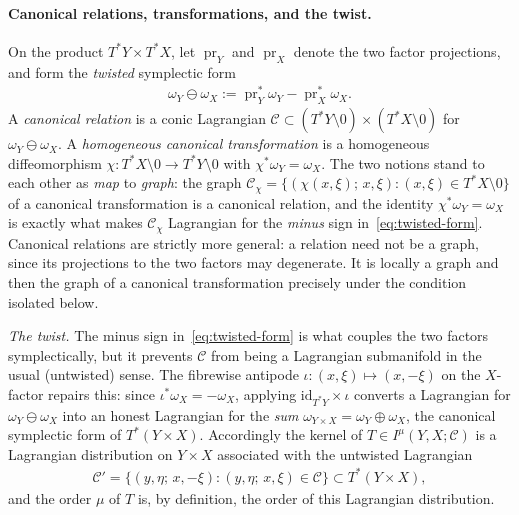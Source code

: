 \documentclass[12pt]{article}
\numberwithin{equation}{section}
\numberwithin{figure}{section}
\numberwithin{equation}{section}
\begin{document}
\paragraph{Canonical relations, transformations, and the twist.}
On the product $T^*Y\times T^*X$, let $\operatorname{pr}_Y$ and $\operatorname{pr}_X$
denote the two factor projections, and form the \emph{twisted} symplectic form
\begin{align}
    \omega_Y\ominus\omega_X
    :=\operatorname{pr}_Y^*\omega_Y-\operatorname{pr}_X^*\omega_X .
    \label{eq:twisted-form}
\end{align}
A \emph{canonical relation} is a conic Lagrangian
$\mathcal{C}\subset(T^*Y\setminus0)\times(T^*X\setminus0)$ for $\omega_Y\ominus\omega_X$.  A
\emph{homogeneous canonical transformation} is a homogeneous diffeomorphism
$\chi:T^*X\setminus0\to T^*Y\setminus0$ with $\chi^*\omega_Y=\omega_X$.  The two
notions stand to each other as \emph{map} to \emph{graph}: the graph
$\mathcal{C}_\chi=\{(\chi(x,\xi);\,x,\xi):(x,\xi)\in T^*X\setminus0\}$ of a canonical
transformation is a canonical relation, and the identity $\chi^*\omega_Y=\omega_X$
is exactly what makes $\mathcal{C}_\chi$ Lagrangian for the \emph{minus} sign
in~\eqref{eq:twisted-form}.  Canonical relations are strictly more general: 
a relation need not be a graph, since its projections to the two factors
may degenerate. It is locally a graph and then the graph of a canonical
transformation precisely under the condition isolated below.

\emph{The twist.}  The minus sign in~\eqref{eq:twisted-form} is what couples the
two factors symplectically, but it prevents $\mathcal{C}$ from being a Lagrangian submanifold
in the usual (untwisted) sense.  The fibrewise antipode
$\iota:(x,\xi)\mapsto(x,-\xi)$ on the $X$-factor repairs this: since
$\iota^*\omega_X=-\omega_X$, applying $\mathrm{id}_{T^*Y}\times\iota$ converts a
Lagrangian for $\omega_Y\ominus\omega_X$ into an honest Lagrangian for the
\emph{sum} $\omega_{Y\times X}=\omega_Y\oplus\omega_X$, the canonical symplectic
form of $T^*(Y\times X)$.  Accordingly the kernel of $T\in I^\mu(Y,X;\mathcal{C})$ is a
Lagrangian distribution on $Y\times X$ associated with the untwisted Lagrangian
\begin{align*}
    \mathcal{C}'=\bigl\{(y,\eta;\,x,-\xi):(y,\eta;\,x,\xi)\in \mathcal{C}\bigr\}\subset T^*(Y\times X),
\end{align*}
and the order $\mu$ of $T$ is, by definition, the order of this Lagrangian
distribution.
\end{document}
